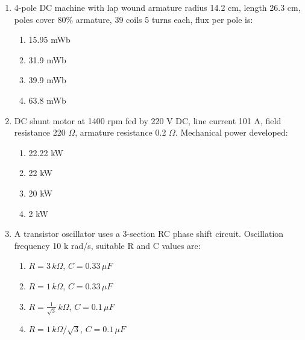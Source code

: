 \documentclass[journal,cmex10]{IEEEtran}
\theoremstyle{remark}
\numberwithin{equation}{enumi}
\numberwithin{figure}{enumi}
\begin{document}
\begin{enumerate}[label=\arabic*)]
    \item 4-pole DC machine with lap wound armature radius 14.2 cm, length 26.3 cm, poles cover 80\% armature, 39 coils 5 turns each, flux per pole is:
    \bigskip
    \hfill {}
    \begin{enumerate}[label=\alph*)]
        \item 15.95 mWb
        \item 31.9 mWb
        \item 39.9 mWb
        \item 63.8 mWb
    \end{enumerate}
    \bigskip

    \item DC shunt motor at 1400 rpm fed by 220 V DC, line current 101 A, field resistance 220 $\Omega$, armature resistance 0.2 $\Omega$. Mechanical power developed:
    \bigskip
    \hfill {}
    \begin{enumerate}[label=\alph*)]
        \item 22.22 kW
        \item 22 kW
        \item 20 kW
        \item 2 kW
    \end{enumerate}
    \bigskip

    \item A transistor oscillator uses a 3-section RC phase shift circuit. Oscillation frequency 10 k rad/s, suitable R and C values are:
    \bigskip
    \hfill {}
    \begin{enumerate}[label=\alph*)]
        \item $R=3\,k\Omega$, $C=0.33\,\mu F$
        \item $R=1\,k\Omega$, $C=0.33\,\mu F$
        \item $R=\frac{1}{\sqrt{3}}\,k\Omega$, $C=0.1\,\mu F$
        \item $R=1\,k\Omega/\sqrt{3}$, $C=0.1\,\mu F$
    \end{enumerate}
    \newpage


\end{enumerate}
\end{document}
